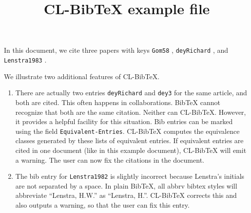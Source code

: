 \documentclass{article}
\title{CL-BibTeX example file}
\begin{document}
\maketitle

In this document, we cite three papers with keys \verb|Gom58| \cite{Gom58},
\verb|deyRichard| \cite{deyRichard}, and \verb|Lenstra1983| \cite{Lenstra1982}.
\medbreak

We illustrate two additional features of CL-BibTeX.

\begin{enumerate}
\item
There are actually two entries \verb|deyRichard| \cite{deyRichard} and
\verb|dey3| \cite{dey3} for the same article, and both are cited.  This often
happens in collaborations. BibTeX cannot recognize that both are the same
citation.  Neither can CL-BibTeX.  However, it provides a helpful facility for
this situation. Bib entries can be marked using the field
\verb|Equivalent-Entries|.  CL-BibTeX computes the equivalence classes
generated by these lists of equivalent entries.  If equivalent entries are
cited in one document (like in this example document), CL-BibTeX will emit a
warning.  The user can now fix the citations in the document.
\item
The bib entry for \verb|Lenstra1982| is slightly incorrect because Lenstra's
initials are not separated by a space.  In plain BibTeX, all abbrv bibtex
styles will abbreviate ``Lenstra, H.W.'' as ``Lenstra, H.''.  CL-BibTeX
corrects this and also outputs a warning, so that the user can fix this entry.
\end{enumerate}



\end{document}
